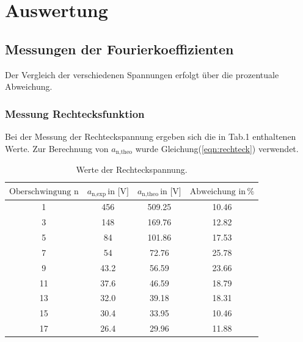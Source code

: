 \newpage
\section{Auswertung}
\label{sec:Auswertung}

\subsection{Messungen der Fourierkoeffizienten}
Der Vergleich der verschiedenen Spannungen erfolgt über die prozentuale Abweichung.

\subsubsection{Messung Rechtecksfunktion}
 Bei der Messung der Rechteckspannung ergeben sich die in Tab.1
 enthaltenen Werte. Zur Berechnung von $a_\text{n,theo} $ wurde
 Gleichung(\ref{eqn:rechteck}) verwendet.

 \begin{table}[h]
   \centering
   \label{rech}
   \begin{tabular}{ c c c c }
     \toprule
    $ \text{Oberschwingung n} $
    &$ a_\text{n,exp} \, \text{in [V]} $
    &$ a_\text{n,theo} \,  \text{in  [V]} $
    &$ \text{Abweichung in} \, \si{\percent} $ \\

     \midrule
     1 &456   & 509.25 & 10.46 \\
     3 &148  & 169.76 & 12.82 \\
     5 & 84    & 101.86 & 17.53  \\
     7 & 54    &  72.76 & 25.78 \\
     9 & 43.2   &  56.59 & 23.66 \\
     11 & 37.6  &  46.59 &  18.79 \\
     13 & 32.0  &  39.18 & 18.31 \\
     15 & 30.4  & 33.95 & 10.46 \\
     17 & 26.4  & 29.96 & 11.88 \\
     \bottomrule
   \end{tabular}
   \caption{Werte der Rechteckspannung.}
 \end{table}

